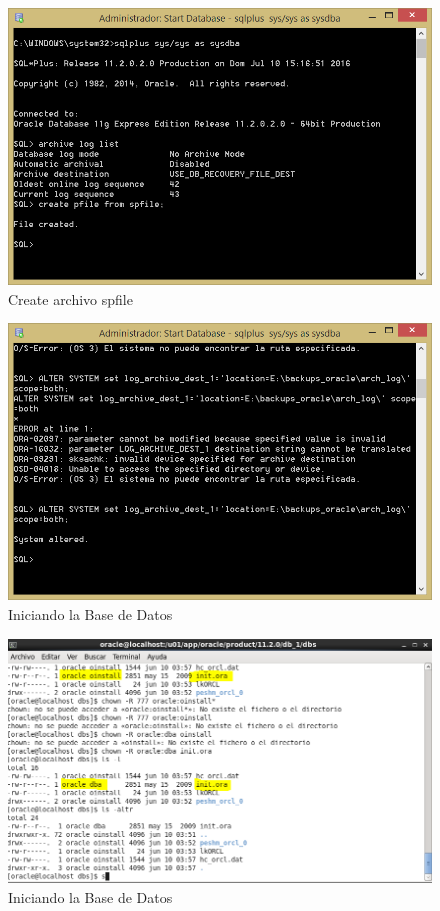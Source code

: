 \begin{figure}[h]
\centering
\includegraphics[scale=1.7]{../images/spfile.png}
\caption{Create archivo spfile}
\label{fig:spfile}
\end{figure}

\begin{figure}[h]
\centering
\includegraphics[scale=1.7]{../images/startdb.png}
\caption{Iniciando la Base de Datos}
\label{fig:startdb}
\end{figure}

\begin{figure}[h]
\centering
\includegraphics[scale=1.7]{../images/linux.png}
\caption{Iniciando la Base de Datos}
\label{fig:linux}
\end{figure}
